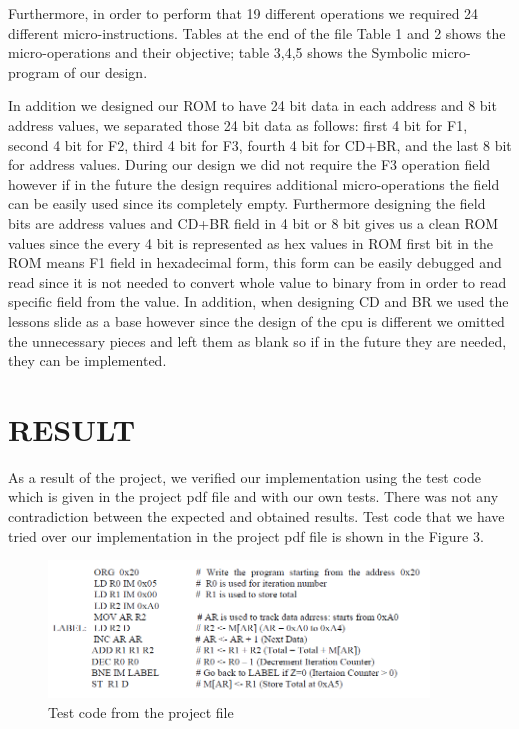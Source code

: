 \documentclass[pdftex,12pt,a4paper]{article}
\begin{document}
Furthermore, in order to perform that 19 different operations we required 24 different micro-instructions.
Tables at the end of the file Table 1 and 2 shows the  micro-operations and their objective; table 3,4,5 shows the Symbolic micro-program of our design. 

In addition we designed our ROM to have 24 bit data in each address and 8 bit address values, we separated those 24 bit data as follows:
first 4 bit  for F1,
second 4 bit for F2,
third 4 bit for F3,
fourth 4 bit for CD+BR,
and the last 8 bit for address values. During our design we did not require the F3 operation field however if in the future the design requires additional micro-operations the field  can be easily used since its completely empty. Furthermore designing the field bits are address values and CD+BR field in 4 bit or 8 bit
gives us a clean ROM values since the every 4 bit is represented as hex values in ROM first bit in the ROM means  F1 field in hexadecimal form, this form can be easily debugged and read since it is not needed to convert whole value to binary from in order to read specific field from the value.  In addition, when designing CD and BR we used the lessons slide as a base however since the design of the cpu is different we 
omitted the unnecessary pieces and left them as blank so if in the future they are needed, they can be implemented.

\clearpage

\section{RESULT}
As a result of the project, we verified our implementation using the test code which is given in the project pdf file and with our own tests. There was not any contradiction between the expected and obtained results. Test code that we have tried over our implementation in the project pdf file is shown in the Figure 3.

\begin{figure}[H]
    	\centering
    	\includegraphics[width=0.9\textwidth]{test.png}	
    	\caption{Test code from the project file}
    	\label{test code}
\end{figure}
\end{document}
